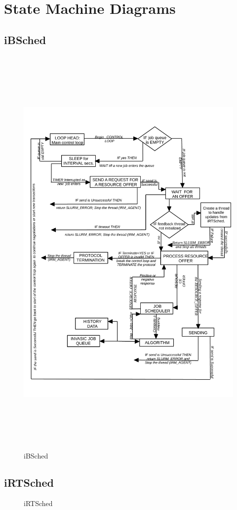 \section{State Machine Diagrams}
\subsection{iBSched}
\begin{figure}[!t]
\centering
\includegraphics[width=1.0\textwidth, height=210mm]{./figures/iBSched.pdf}
\caption{iBSched}
\label{fig:Neg}
\end{figure}
\subsection{iRTSched}
\begin{figure}[!htbp]
\centering
\caption{iRTSched}
\label{fig:Neg}
\end{figure}
